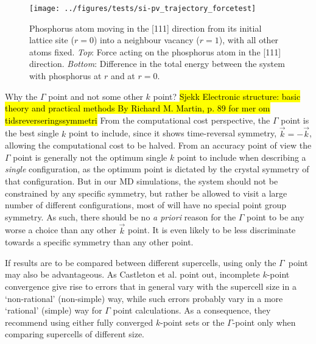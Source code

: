 \documentclass[11pt,bibliography=totoc,index=totoc]{scrbook}   %
\newcommand{\comment}[1]{\hl{#1}}
\begin{document}
\begin{figure}[htbp]
  \begin{center}
    \texttt{[image: ../figures/tests/si-pv\_trajectory\_forcetest]}
  \end{center}
  \caption{Phosphorus atom moving in the [111] direction from its initial lattice site ($r=0$) into a neighbour vacancy ($r=1$),
    with all other atoms fixed.
    \textit{Top}: Force acting on the phosphorus atom in the [111] direction. 
    \textit{Bottom}: Difference in the total energy between the system with phosphorus at $r$ and at $r=0$.
    }
    \label{fig:tests/si-pv_k}
\end{figure}

Why the $\Gamma$ point and not some other $k$ point?
\comment{Sjekk 
Electronic structure: basic theory and practical methods By Richard M. Martin, p. 89 for mer om tidsreverseringssymmetri}
From the computational cost perspective, the $\Gamma$ point is the best single $k$ point to include, since it shows time-reversal symmetry, 
$\vec{k}=-\vec{k}$, allowing the computational cost to be halved. 
From an accuracy point of view the $\Gamma$ point is generally not the optimum single $k$ point to include when describing a \emph{single} configuration, as the optimum point is dictated by the crystal symmetry of that configuration\cite{Baldereschi:1973}. 
But in our MD simulations, the system should not be constrained by any specific symmetry, but rather be allowed to visit a large number of different configurations, most of will have no special point group symmetry. 
As such, there should be no \textit{a priori} reason for the $\Gamma$ point to be any worse a choice than any other $\vec{k}$ point. 
It is even likely to be less discriminate towards a specific symmetry than any other point.

If results are to be compared between different supercells, using only the $\Gamma$~point may also be advantageous.
As Castleton et al. point out\cite{Castleton:2009}, incomplete $k$-point convergence give rise to errors that in general vary with the supercell size in a `non-rational' (non-simple) way, while such errors probably vary in a more `rational' (simple) way for $\Gamma$ point calculations. 
As a consequence, they recommend using either fully converged $k$-point sets or the $\Gamma$-point only when comparing supercells of different size.


\end{document}
